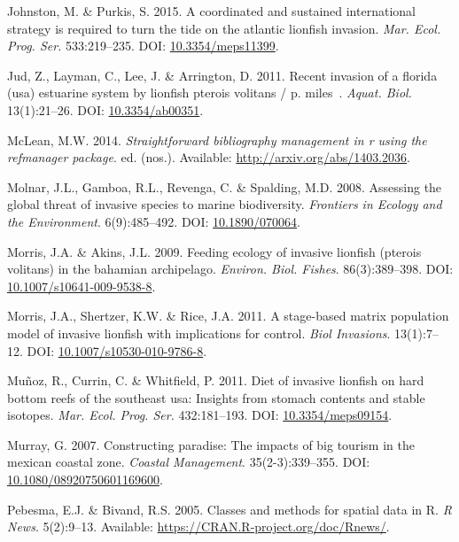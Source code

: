 \documentclass[12pt,]{article}
\begin{document}
\hypertarget{ref-johnston_2015}{}
Johnston, M. \& Purkis, S. 2015. A coordinated and sustained
international strategy is required to turn the tide on the atlantic
lionfish invasion. \emph{Mar. Ecol. Prog. Ser.} 533:219--235. DOI:
\href{https://doi.org/10.3354/meps11399}{10.3354/meps11399}.

\hypertarget{ref-jud_2011}{}
Jud, Z., Layman, C., Lee, J. \& Arrington, D. 2011. Recent invasion of a
florida (usa) estuarine system by lionfish pterois volitans / p. miles~.
\emph{Aquat. Biol.} 13(1):21--26. DOI:
\href{https://doi.org/10.3354/ab00351}{10.3354/ab00351}.

\hypertarget{ref-RefManager_2014}{}
McLean, M.W. 2014. \emph{Straightforward bibliography management in r
using the refmanager package}. ed. (nos.). Available:
\url{http://arxiv.org/abs/1403.2036}.

\hypertarget{ref-molnar_2008}{}
Molnar, J.L., Gamboa, R.L., Revenga, C. \& Spalding, M.D. 2008.
Assessing the global threat of invasive species to marine biodiversity.
\emph{Frontiers in Ecology and the Environment}. 6(9):485--492. DOI:
\href{https://doi.org/10.1890/070064}{10.1890/070064}.

\hypertarget{ref-morris_2009}{}
Morris, J.A. \& Akins, J.L. 2009. Feeding ecology of invasive lionfish
(pterois volitans) in the bahamian archipelago. \emph{Environ. Biol.
Fishes}. 86(3):389--398. DOI:
\href{https://doi.org/10.1007/s10641-009-9538-8}{10.1007/s10641-009-9538-8}.

\hypertarget{ref-morris_2011}{}
Morris, J.A., Shertzer, K.W. \& Rice, J.A. 2011. A stage-based matrix
population model of invasive lionfish with implications for control.
\emph{Biol Invasions}. 13(1):7--12. DOI:
\href{https://doi.org/10.1007/s10530-010-9786-8}{10.1007/s10530-010-9786-8}.

\hypertarget{ref-muoz_2011}{}
Muñoz, R., Currin, C. \& Whitfield, P. 2011. Diet of invasive lionfish
on hard bottom reefs of the southeast usa: Insights from stomach
contents and stable isotopes. \emph{Mar. Ecol. Prog. Ser.} 432:181--193.
DOI: \href{https://doi.org/10.3354/meps09154}{10.3354/meps09154}.

\hypertarget{ref-murray_2007}{}
Murray, G. 2007. Constructing paradise: The impacts of big tourism in
the mexican coastal zone. \emph{Coastal Management}. 35(2-3):339--355.
DOI:
\href{https://doi.org/10.1080/08920750601169600}{10.1080/08920750601169600}.

\hypertarget{ref-sp_2017}{}
Pebesma, E.J. \& Bivand, R.S. 2005. Classes and methods for spatial data
in R. \emph{R News}. 5(2):9--13. Available:
\url{https://CRAN.R-project.org/doc/Rnews/}.
\end{document}

